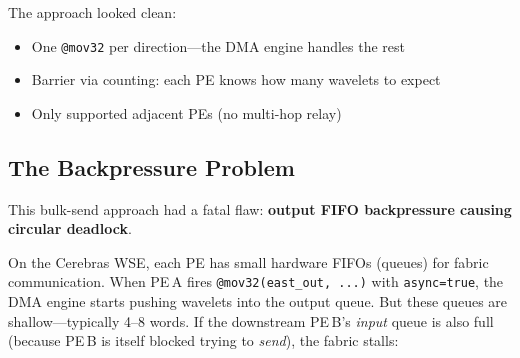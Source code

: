 \documentclass[11pt,letterpaper]{article}
\begin{document}
The approach looked clean:
\begin{itemize}[nosep]
  \item One \texttt{@mov32} per direction---the DMA engine handles the rest
  \item Barrier via counting: each PE knows how many wavelets to expect
  \item Only supported adjacent PEs (no multi-hop relay)
\end{itemize}

\subsection{The Backpressure Problem}
\label{sec:backpressure}

This bulk-send approach had a fatal flaw: \textbf{output FIFO backpressure causing circular deadlock}.

On the Cerebras WSE, each PE has small hardware FIFOs (queues) for fabric communication. When PE\,A fires \texttt{@mov32(east\_out, ...)} with \texttt{async=true}, the DMA engine starts pushing wavelets into the output queue. But these queues are shallow---typically 4--8 words. If the downstream PE\,B's \emph{input} queue is also full (because PE\,B is itself blocked trying to \emph{send}), the fabric stalls:

\begin{center}
\end{center}
\end{document}
